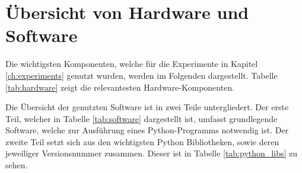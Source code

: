 \chapter{Übersicht von Hardware und Software}\label{ch:hard_software}

Die wichtigsten Komponenten, welche für die Experimente in Kapitel \ref{ch:experiments} genutzt wurden, werden im Folgenden dargestellt.
Tabelle \ref{tab:hardware} zeigt die relevantesten Hardware-Komponenten.


Die Übersicht der genutzten Software ist in zwei Teile untergliedert.
Der erste Teil, welcher in Tabelle \ref{tab:software} dargestellt ist, umfasst grundlegende Software, welche zur Ausführung eines Python-Programms notwendig ist.
Der zweite Teil setzt sich aus den wichtigsten Python Bibliotheken, sowie deren jeweiliger Versionsnummer zusammen. 
Dieser ist in Tabelle \ref{tab:python_libs} zu sehen.



